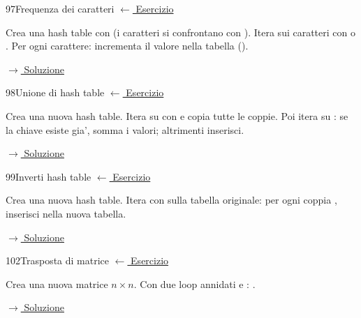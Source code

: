\label{hint:97}
\begin{hintbox}{97}{Frequenza dei caratteri}
\small\color{black!55}\hyperref[ex:97]{$\leftarrow$ Esercizio}\normalsize\color{black}

Crea una hash table con  (i caratteri si
confrontano con ).
Itera sui caratteri con 
o .
Per ogni carattere: incrementa il valore nella tabella
().

\small\color{black!55}\hyperref[sol:97]{$\rightarrow$ Soluzione}\normalsize\color{black}
\end{hintbox}

\label{hint:98}
\begin{hintbox}{98}{Unione di hash table}
\small\color{black!55}\hyperref[ex:98]{$\leftarrow$ Esercizio}\normalsize\color{black}

Crea una nuova hash table. Itera su  con 
e copia tutte le coppie. Poi itera su : se la chiave
esiste gia', somma i valori; altrimenti inserisci.

\small\color{black!55}\hyperref[sol:98]{$\rightarrow$ Soluzione}\normalsize\color{black}
\end{hintbox}

\label{hint:99}
\begin{hintbox}{99}{Inverti hash table}
\small\color{black!55}\hyperref[ex:99]{$\leftarrow$ Esercizio}\normalsize\color{black}

Crea una nuova hash table. Itera con  sulla
tabella originale: per ogni coppia , inserisci
 nella nuova tabella.

\small\color{black!55}\hyperref[sol:99]{$\rightarrow$ Soluzione}\normalsize\color{black}
\end{hintbox}

\label{hint:102}
\begin{hintbox}{102}{Trasposta di matrice}
\small\color{black!55}\hyperref[ex:102]{$\leftarrow$ Esercizio}\normalsize\color{black}

Crea una nuova matrice $n \times n$. Con due loop annidati
 e :
.

\small\color{black!55}\hyperref[sol:102]{$\rightarrow$ Soluzione}\normalsize\color{black}
\end{hintbox}

